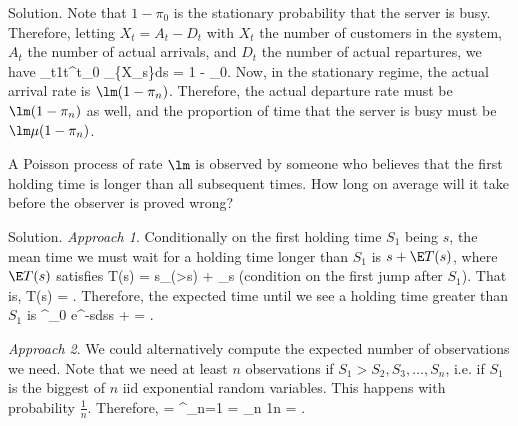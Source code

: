 
Solution. Note that $1-\pi_0$ is the stationary probability that the server is busy. Therefore, letting $X_t = A_t - D_t$ with $X_t$ the number of customers in the system, $A_t$ the number of actual arrivals, and $D_t$ the number of actual repartures, we have 
\be
\lim_{t\to\infty}\frac 1t\int^t_0 \ind_{\{X_s\}}ds = 1 - \pi_0.
\ee
Now, in the stationary regime, the actual arrival rate is $\lm (1 - \pi_n)$. Therefore, the actual departure rate must be $\lm (1-\pi_n)$ as well, and the proportion of time that the server is busy must be $\lm \mu (1 - \pi_n)$.

\vspace{2mm}

\qcutline


\begin{exercise}
A Poisson process of rate $\lm$ is observed by someone who believes that the first holding time is longer than all subsequent times. How long on average will it take before the observer is proved wrong?
\end{exercise}


Solution. \emph{Approach 1}. Conditionally on the first holding time $S_1$ being $s$, the mean time we must wait for a holding time longer than $S_1$ is $s + \E T(s)$, where $\E T(s)$ satisfies
\be
\E T(s) = s_{\pro(>s)} + _{\leq s}
\ee
(condition on the first jump after $S_1$). That is, 
\be
\E T(s) =  .
\ee
Therefore, the expected time until we see a holding time greater than $S_1$ is 
\be
\int^\infty_0 \lm e^{-\lm s}ds\lob s + \rob = \infty.
\ee

\emph{Approach 2}. We could alternatively compute the expected number of observations we need. Note that we need at least $n$ observations if $S_1 > S_2, S_3,\dots, S_n$, i.e. if $S_1$ is the biggest of $n$ iid exponential random variables. This happens with probability $\frac 1n$. Therefore,
\be
\E \lob {}\rob = \sum^\infty_{n=1} \pro\lob {}\rob = \sum_{n} \frac 1n = \infty.
\ee

